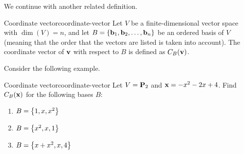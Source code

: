 We continue with another related definition.

\begin{definition}{Coordinate vector}{coordinate-vector}
  Let $V$ be a finite-dimensional vector space with $\dim(V)=n$, and
  let $B=\left\{\mbox{\bf b}_1, \mbox{\bf b}_2, \ldots, \mbox{\bf b}_n\right\}$ be an
  ordered basis of $V$ (meaning that the order that the vectors are
  listed is taken into account).  The coordinate vector of $\mbox{\bf v}$
  with respect to $B$ is defined as $C_B(\mbox{\bf v})$.
\end{definition}

Consider the following example.

\begin{example}{Coordinate vector}{coordinate-vector}
  Let $V = \mathbf{P}_2$ and $\mbox{\bf x} = -x^2 -2x + 4$.
  Find $C_B(\mbox{\bf x})$ for the following bases $B$:
  \begin{enumerate}
  \item $B = \left\{1, x, x^2 \right\}$
  \item $B = \left\{x^2, x, 1 \right\}$
  \item $B = \left\{x + x^2 , x , 4 \right\}$
  \end{enumerate}
\end{example}

